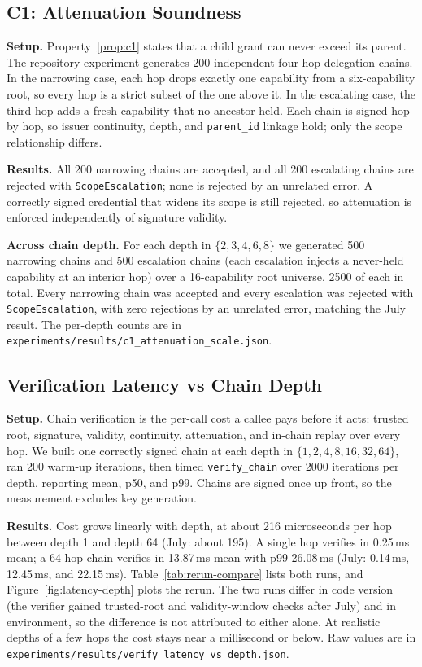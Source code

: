 \subsection{C1: Attenuation Soundness}
\label{sec:eval-c1}

\textbf{Setup.} Property~\ref{prop:c1} states that a child grant can never exceed its parent.
The repository experiment generates 200 independent four-hop delegation chains. In the narrowing
case, each hop drops exactly one capability from a six-capability root, so every hop is a strict
subset of the one above it. In the escalating case, the third hop adds a fresh capability that no
ancestor held. Each chain is signed hop by hop, so issuer continuity, depth, and
\texttt{parent\_id} linkage hold; only the scope relationship differs.

\textbf{Results.} All 200 narrowing chains are accepted, and all 200 escalating chains are
rejected with \texttt{ScopeEscalation}; none is rejected by an unrelated error. A correctly
signed credential that widens its scope is still rejected, so attenuation is enforced
independently of signature validity.

\textbf{Across chain depth.} For each depth in $\{2,3,4,6,8\}$ we generated 500 narrowing chains
and 500 escalation chains (each escalation injects a never-held capability at an interior hop)
over a 16-capability root universe, 2500 of each in total. Every narrowing chain was accepted and
every escalation was rejected with \texttt{ScopeEscalation}, with zero rejections by an unrelated
error, matching the July result. The per-depth counts are in
\texttt{experiments/results/c1\_attenuation\_scale.json}.

\subsection{Verification Latency vs Chain Depth}
\label{sec:eval-latency}

\textbf{Setup.} Chain verification is the per-call cost a callee pays before it acts: trusted
root, signature, validity, continuity, attenuation, and in-chain replay over every hop. We built
one correctly signed chain at each depth in $\{1,2,4,8,16,32,64\}$, ran 200 warm-up iterations,
then timed \texttt{verify\_chain} over 2000 iterations per depth, reporting mean, p50, and p99.
Chains are signed once up front, so the measurement excludes key generation.

\textbf{Results.} Cost grows linearly with depth, at about 216 microseconds per hop between depth
1 and depth 64 (July: about 195). A single hop verifies in 0.25\,ms mean; a 64-hop chain verifies
in 13.87\,ms mean with p99 26.08\,ms (July: 0.14\,ms, 12.45\,ms, and 22.15\,ms).
Table~\ref{tab:rerun-compare} lists both runs, and Figure~\ref{fig:latency-depth} plots the rerun.
The two runs differ in code version (the verifier gained trusted-root and validity-window checks
after July) and in environment, so the difference is not attributed to either alone. At realistic depths of a few
hops the cost stays near a millisecond or below. Raw values are in
\texttt{experiments/results/verify\_latency\_vs\_depth.json}.

